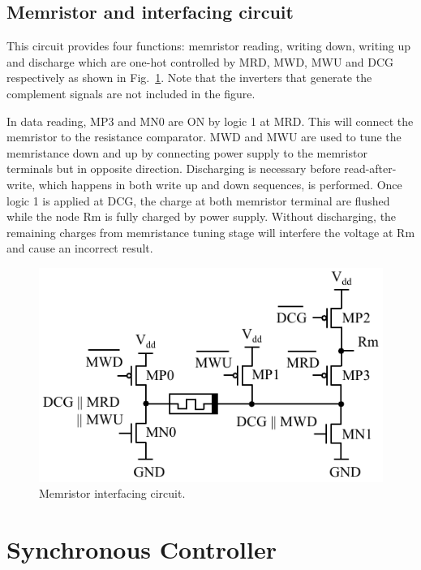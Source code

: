 \documentclass[twocolumn,conference]{IEEEtran}
\begin{document}
\subsection{Memristor and interfacing circuit}
\label{subsec:MemristorAndInterfacingCircuit}
This circuit provides four functions: memristor reading, writing down, writing up and discharge which are one-hot controlled by MRD, MWD, MWU and DCG respectively as shown in Fig.~\ref{fig:MemristorInterfacing}. Note that the inverters that generate the complement signals are not included in the figure. 

In data reading, MP3 and MN0 are ON by logic 1 at MRD. This will connect the memristor to the resistance comparator. MWD and MWU are used to tune the memristance down and up by connecting power supply to the memristor terminals but in opposite direction. Discharging is necessary before read-after-write, which happens in both write up and down sequences, is performed. Once logic 1 is applied at DCG, the charge at both memristor terminal are flushed while the node Rm is fully charged by power supply. Without discharging, the remaining charges from memristance tuning stage will interfere the voltage at Rm and cause an incorrect result. 
\begin{figure}[ht]
    \centering
    \includegraphics[scale=0.7]{figs/MemristorInterfacingCircuitV3}
    \caption{Memristor interfacing circuit.}
    \label{fig:MemristorInterfacing}
\end{figure}
\section{Synchronous Controller}
\label{sec:SynchronousController}
\end{document}
